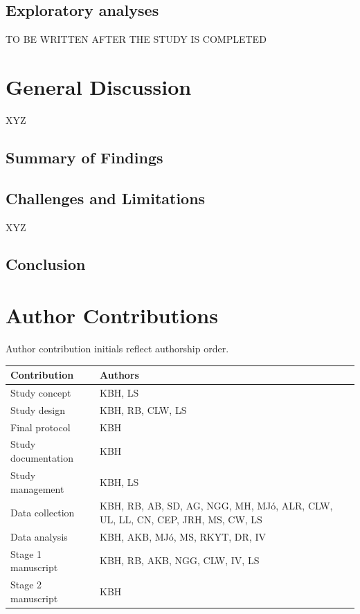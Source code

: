 \documentclass[,man,floatsintext]{apa6}
\begin{document}
\hypertarget{exploratory-analyses}{%
\subsection{Exploratory analyses}\label{exploratory-analyses}}

TO BE WRITTEN AFTER THE STUDY IS COMPLETED

\hypertarget{general-discussion}{%
\section{General Discussion}\label{general-discussion}}

XYZ

\hypertarget{summary-of-findings}{%
\subsection{Summary of Findings}\label{summary-of-findings}}

\hypertarget{challenges-and-limitations}{%
\subsection{Challenges and Limitations}\label{challenges-and-limitations}}

XYZ

\hypertarget{conclusion}{%
\subsection{Conclusion}\label{conclusion}}

\hypertarget{author-contributions}{%
\section{Author Contributions}\label{author-contributions}}

Author contribution initials reflect authorship order.

\begin{longtable}{l>{\raggedright\arraybackslash}p{30em}}
\toprule
Contribution & Authors\\
\midrule
Study concept & KBH, LS\\
Study design & KBH, RB, CLW, LS\\
Final protocol & KBH\\
Study documentation & KBH\\
Study management & KBH, LS\\
\addlinespace
Data collection & KBH, RB, AB, SD, AG, NGG, MH, MJó, ALR, CLW, UL, LL, CN, CEP, JRH, MS, CW, LS\\
Data analysis & KBH, AKB, MJó, MS, RKYT, DR, IV\\
Stage 1 manuscript & KBH, RB, AKB, NGG, CLW, IV, LS\\
Stage 2 manuscript & KBH\\
\bottomrule
\end{longtable}
\end{document}
